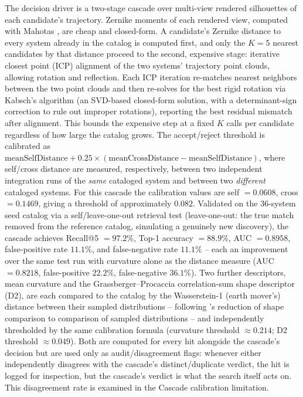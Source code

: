 \documentclass[11pt]{article}
\begin{document}
The decision driver is a two-stage cascade over multi-view rendered
silhouettes of each candidate's trajectory. Zernike moments of each rendered
view, computed with Mahotas \citep{coelho2013mahotas}, are cheap and
closed-form. A candidate's Zernike distance to every
system already in the catalog is computed first, and only the $K = 5$
nearest candidates by that distance proceed to the second, expensive stage:
iterative closest point (ICP) alignment \citep{besl1992method} of the two
systems' trajectory point clouds, allowing rotation and reflection. Each ICP
iteration re-matches nearest neighbors between the two point clouds and then
re-solves for the best rigid rotation via Kabsch's algorithm
\citep{kabsch1976solution} (an SVD-based closed-form solution, with a
determinant-sign correction to rule out improper rotations), reporting the
best residual mismatch after alignment. This bounds the expensive step at a
fixed $K$ calls
per candidate regardless of how large the catalog grows. The accept/reject
threshold is calibrated as $\mathrm{meanSelfDistance} + 0.25 \times
(\mathrm{meanCrossDistance} - \mathrm{meanSelfDistance})$, where self/cross
distance are measured, respectively, between two independent integration
runs of the \emph{same} cataloged system and between two \emph{different}
cataloged systems. For this cascade the calibration values are self
$= 0.0608$, cross $= 0.1469$, giving a threshold of approximately $0.082$.
Validated on the 36-system seed catalog via a self/leave-one-out retrieval
test (leave-one-out: the true match removed from the reference catalog,
simulating a genuinely new discovery), the cascade achieves Recall@5
$= 97.2\%$, Top-1 accuracy $= 88.9\%$, AUC $= 0.8958$, false-positive rate
$11.1\%$, and false-negative rate $11.1\%$ -- each an improvement over the
same test run with curvature alone as the distance measure (AUC $= 0.8218$,
false-positive $22.2\%$, false-negative $36.1\%$). Two further descriptors,
mean curvature and the Grassberger--Procaccia correlation-sum shape
descriptor (D2), are each compared to the catalog by the Wasserstein-1
(earth mover's) distance \citep{rubner2000earth} between their sampled
distributions -- following \citet{osada2002shape}'s reduction of shape
comparison to comparison of sampled distributions -- and independently
thresholded by the same calibration formula (curvature threshold
$\approx 0.214$; D2 threshold $\approx 0.049$). Both are computed for every
hit alongside the cascade's decision but are used
only as audit/disagreement flags: whenever either independently
disagrees with the cascade's distinct/duplicate verdict, the hit is logged
for inspection, but the cascade's verdict is what the search itself acts on.
This disagreement rate is examined in the Cascade calibration limitation.
\end{document}
